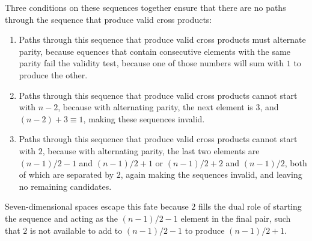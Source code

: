 \documentclass[11pt]{article}
\begin{document}
Three conditions on these sequences together ensure that there are no paths through the sequence that produce valid cross products: 
\begin{enumerate}
\item Paths through this sequence that produce valid cross products must alternate parity, because equences that contain consecutive elements with the same parity fail the validity test, because one of those numbers will sum with $1$ to produce the other.
\item Paths through this sequence that produce valid cross products cannot start with $n-2$, because with alternating parity, the next element is $3$, and  $(n-2)+3 \equiv 1$, making these sequences invalid.
\item Paths through this sequence that produce valid cross products cannot start with $2$, because with alternating parity, the last two elements are 
$(n-1)/2 -1$ and $(n-1)/2 +1$ or $(n-1)/2 +2 $ and $(n-1)/2$, both of which are separated by $2$, again making the sequences invalid, and leaving no remaining candidates.
\end{enumerate}
Seven-dimensional spaces escape this fate because $2$ fills the dual role of starting the sequence and acting as the $(n-1)/2 -1$ element in the final pair, such that $2$ is not available to add to $(n-1)/2 -1$ to produce $(n-1)/2 + 1$.
\end{document}

